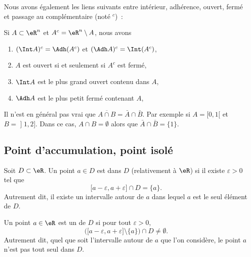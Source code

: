 Nous avons également les liens suivants entre intérieur, adhérence, ouvert, fermé et passage au complémentaire (noté ${}^c$)~:
\begin{proposition}
Si $A \subset \eR^n$ et $A^c = \eR^n\setminus A$, nous
  avons
  \begin{enumerate}
  \item $(\Int A)^c = \Adh (A^c)$ et $(\Adh A)^c = \Int
    (A^c)$,
  \item $A$ est ouvert si et seulement si $A^c$ est fermé,
  \item $\Int A$ est le plus grand ouvert contenu dans $A$,
  \item $\Adh A$ est le plus petit fermé contenant $A$,
  \end{enumerate}
\end{proposition}

\begin{example} \label{ExBFLooUNyvbw}
    Il n'est en général pas vrai que \( \overline{ A\cap B }=\bar A\cap \bar B\). Par exemple si \( A=\mathopen[ 0 , 1 [\) et \( B=\mathopen] 1 , 2 \mathclose]\). Dans ce cas, \( A\cap B=\emptyset\) alors que \( \bar A\cap\bar B=\{ 1 \}\).
\end{example}

\subsection{Point d'accumulation, point isolé}

Soit $D\subset\eR$. Un point $a\in D$ est  dans $D$ (relativement à $\eR$) si il existe $\varepsilon>0$ tel que 
\begin{equation}
	\mathopen[ a-\varepsilon , a+\varepsilon \mathclose]\cap D=\{ a \}.
\end{equation}
Autrement dit, il existe un intervalle autour de $a$ dans lequel $a$ est le seul élément de $D$.

Un point $a\in \eR$ est un  de $D$ si pour tout $\varepsilon>0$, 
\begin{equation}
	\Big( \mathopen[ a-\varepsilon , a+\varepsilon \mathclose]\setminus\{ a \} \Big)\cap D\neq\emptyset.
\end{equation}
Autrement dit, quel que soit l'intervalle autour de  $a$ que l'on considère, le point $a$ n'est pas tout seul dans $D$.

